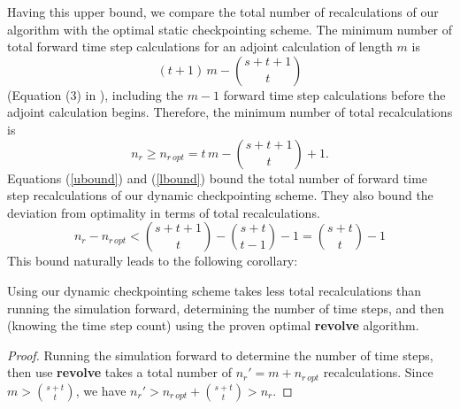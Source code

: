 \documentclass[oneeqnum, onethmnum, onefignum, onetabnum]{siamltex}
\begin{document}
Having this upper bound, we compare the total number of recalculations
of our algorithm with the optimal static checkpointing scheme.
The minimum number of total forward time step calculations for an adjoint
calculation of length $m$ is
\[ (t + 1)\, m - \binom{s + t + 1}{t} \]
(Equation (3) in \cite{griewank00}),
including the $m - 1$ forward time step calculations before the adjoint
calculation begins.  Therefore, the minimum number of total recalculations is
\begin{equation} \label{lbound}
n_r \ge n_{r\,opt} = t\, m - \binom{s + t + 1}{t} + 1.
\end{equation}
Equations (\ref{ubound}) and (\ref{lbound}) bound the total number of forward
time step recalculations of our dynamic checkpointing scheme.  They also
bound the deviation from optimality in terms of total recalculations.
\[ n_r - n_{r\,opt} < \binom{s + t + 1}{t}
  - \binom{s + t}{t - 1} - 1 = \binom{s + t}{t} - 1 \]
This bound naturally leads to the following corollary:
\begin{corollary} \label{cor3}
Using our dynamic checkpointing scheme takes less total recalculations
than running the simulation forward, determining the number of time steps, and
then (knowing the time step count) using the proven optimal {\bf revolve}
algorithm.
\end{corollary}
\begin{proof}
Running the simulation forward to determine the number of time steps,
then use {\bf revolve} takes a total number of $n_r' = m + n_{r\,opt}$
recalculations.  Since $m > \binom{s + t}{t}$, we have
$n_r' > n_{r\,opt} + \binom{s + t}{t} > n_r$.
\end{proof}
\end{document}
